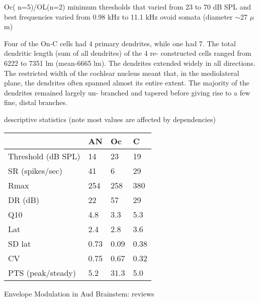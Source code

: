 \documentclass[10pt,a4paper]{article}
\begin{document}
\citep{ArnottWallaceEtAl:2003}
Oc( n=5)/OL(n=2) minimum thresholds that varied from 23 to 70 dB SPL and best frequencies varied from 0.98 kHz to 11.1 kHz
ovoid somata (diameter $\sim$27 $\mu$m) 

Four of the On-C cells
had 4 primary dendrites, while one had 7. The total
dendritic length (sum of all dendrites) of the 4 re-
constructed cells ranged from 6222 to 7351 lm
(mean-6665 lm). The dendrites extended widely in
all directions. The restricted width of the cochlear
nucleus meant that, in the mediolateral plane, the
dendrites often spanned almost its entire extent. The
majority of the dendrites remained largely un-
branched and tapered before giving rise to a few fine,
distal branches.





\citep{RhodeSmith:1986} descriptive statistics (note most values are affected by dependencies)

\begin{flushleft}
  \tablehead{}
  \begin{supertabular}{|m{4.658cm}|m{4.658cm}|m{4.658cm}|m{4.6930003cm}|}
\hline
                   &  AN  &  Oc  & C    \\\hline
Threshold (dB SPL) &  14  &  23  & 19   \\\hline
SR   (spikes/sec)  &  41  &  6   & 29 \\\hline
       Rmax        & 254  & 258  & 380  \\\hline
     DR (dB)       &  22  &  57  & 29\\\hline
       Q10         & 4.8  & 3.3  & 5.3\\\hline
       Lat         & 2.4  & 2.8  & 3.6\\\hline
      SD lat       & 0.73 & 0.09 & 0.38\\\hline
        CV         & 0.75 & 0.67 & 0.32\\\hline
PTS (peak/steady)  & 5.2  & 31.3 & 5.0\\\hline
\end{supertabular}
\end{flushleft}

Envelope Modulation in Aud Brainstem:
\citep{CondonChangEtAl:1995,FrisinaKarcichEtAl:1996,FrisinaSmithEtAl:1990a,FrisinaSmithEtAl:1990,FrisinaWaltonEtAl:1993,KimSirianniEtAl:1990,Moller:1972,Moller:1976,ReesMoller:1983,ReesMoller:1987,ReesPalmer:1989,Rhode:1998,Rhode:1994,WangSachs:1992,ZhaoLiang:1995,ZhaoLiang:1997}
reviews \citep{Langner:1992,RhodeGreenberg:1994a}
\end{document}
